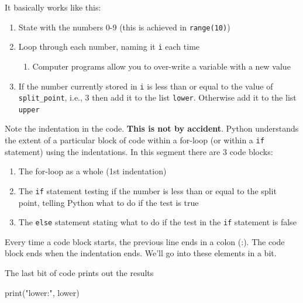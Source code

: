 \documentclass[
  letterpaper,
]{scrbook}
\newenvironment{Shaded}{\begin{snugshade}}{\end{snugshade}}
\newcommand{\BuiltInTok}[1]{#1}
\newcommand{\NormalTok}[1]{#1}
\newcommand{\StringTok}[1]{\textcolor[rgb]{0.31,0.60,0.02}{#1}}
\providecommand{\tightlist}{%
  \setlength{\itemsep}{0pt}\setlength{\parskip}{0pt}}
\begin{document}
It basically works like this:

\begin{enumerate}
\def\labelenumi{\arabic{enumi}.}
\tightlist
\item
  State with the numbers 0-9 (this is achieved in \texttt{range(10)})
\item
  Loop through each number, naming it \texttt{i} each time

  \begin{enumerate}
  \def\labelenumii{\arabic{enumii}.}
  \tightlist
  \item
    Computer programs allow you to over-write a variable with a new value
  \end{enumerate}
\item
  If the number currently stored in \texttt{i} is less than or equal to the value of \texttt{split\_point}, i.e., 3 then add it to the list \texttt{lower}. Otherwise add it to the list \texttt{upper}
\end{enumerate}

Note the indentation in the code. \textbf{This is not by accident}. Python understands the extent of a particular block of code within a for-loop (or within a \texttt{if} statement) using the indentations. In this segment there are 3 code blocks:

\begin{enumerate}
\def\labelenumi{\arabic{enumi}.}
\tightlist
\item
  The for-loop as a whole (1st indentation)
\item
  The \texttt{if} statement testing if the number is less than or equal to the split point, telling Python what to do if the test is true
\item
  The \texttt{else} statement stating what to do if the test in the \texttt{if} statement is false
\end{enumerate}

Every time a code block starts, the previous line ends in a colon (:). The code block ends when the indentation ends. We'll go into these elements in a bit.

The last bit of code prints out the results

\begin{Shaded}
\begin{Highlighting}[]
\BuiltInTok{print}\NormalTok{(}\StringTok{"lower:"}\NormalTok{, lower)}
\end{Highlighting}
\end{Shaded}
\end{document}
